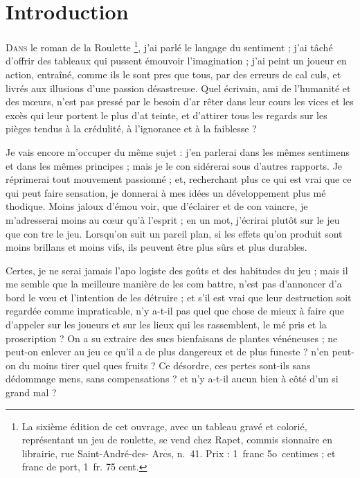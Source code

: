 \chapter{Introduction}

\lettrine{D}{ans} le roman de la Roulette
\footnote{
  La sixième édition de cet ouvrage, avec
  un tableau gravé et colorié, représentant un
  jeu de roulette, se vend chez Rapet, commis%
  sionnaire en librairie, rue Saint-André-des-%
  Arcs, n.~41. Prix : 1~franc 5o~centimes ;  et
  franc de port, 1~fr. 75 cent.},
j'ai parlé le langage du sentiment ;
j'ai tâché d'offrir des tableaux qui
pussent émouvoir l'imagination ;
j'ai peint un joueur en action,
entraîné, comme ils le sont pres%
que tous, par des erreurs de cal%
culs, et livrés aux illusions d'une
passion désastreuse. Quel écrivain,
ami de l'humanité et des mœurs,
n'est pas pressé par le besoin d'ar%
rêter dans leur cours les vices et les
excès qui leur portent le plus d'at%
teinte, et d'attirer tous les regards
sur les pièges tendus à la crédulité,
à l'ignorance et à la faiblesse ?

Je vais encore m'occuper du
même sujet : j'en parlerai dans les
mêmes sentimens et dans les
mêmes principes ; mais je le con%
sidérerai sous d'autres rapports.
Je réprimerai tout mouvement
passionné ; et, recherchant plus
ce qui est vrai que ce qui peut
faire sensation, je donnerai à mes
idées un développement plus mé%
thodique. Moins jaloux d'émou%
voir, que d'éclairer et de con%
vaincre, je m'adresserai moins au
cœur qu'à l'esprit ; en un mot,
j'écrirai plutôt sur le jeu que con%
tre le jeu. Lorsqu'on suit un pareil
plan, si les effets qu'on produit
sont moins brillans et moins vifs,
ils peuvent être plus sûrs et plus
durables.

Certes, je ne serai jamais l'apo%
logiste des goûts et des habitudes
du jeu ; mais il me semble que la
meilleure manière de les com%
battre, n'est pas d'annoncer d'a%
bord le vœu et l'intention de les
détruire ; et s'il est vrai que leur
destruction soit regardée comme
impraticable, n'y a-t-il pas quel%
que chose de mieux à faire que
d'appeler sur les joueurs et sur les
lieux qui les rassemblent, le mé%
pris et la proscription ? On a su
extraire des sucs bienfaisans de
plantes vénéneuses ; ne peut-on
enlever au jeu ce qu'il a de plus
dangereux et de plus funeste ?
n'en peut-on du moins tirer quel%
ques fruits ? Ce désordre, ces
pertes sont-ils sans dédommage%
mens, sans compensations ? et n'y
a-t-il aucun bien à côté d'un si
grand mal ?

